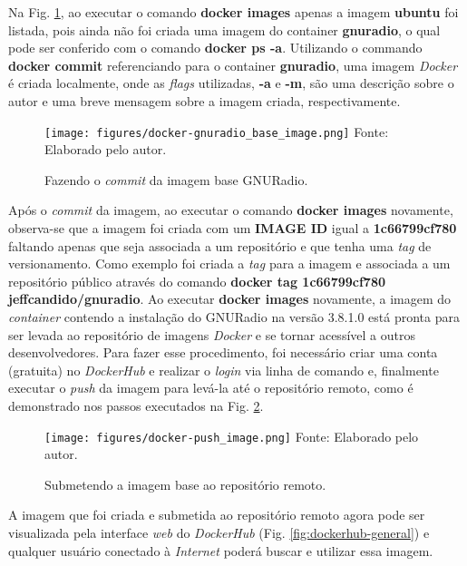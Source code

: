 \documentclass[
  12pt,				%
  openright,			%
  twoside,			%
  a4paper,			%
  english,			%
  french,				%
  spanish,			%
  brazil,				%
  ]{abntex2}
\begin{document}
Na Fig. \ref{fig:docker-gnuradio_base_image}, ao executar o comando \textbf{docker images} apenas a imagem \textbf{ubuntu}
foi listada, pois ainda não foi criada uma imagem do container \textbf{gnuradio}, o qual pode ser conferido com o comando
\textbf{docker ps -a}. Utilizando o commando \textbf{docker commit} referenciando para o container \textbf{gnuradio}, uma imagem
\textit{Docker} é criada localmente, onde as \textit{flags} utilizadas, \textbf{-a} e \textbf{-m}, são uma descrição
sobre o autor e uma breve mensagem sobre a imagem criada, respectivamente.

\begin{figure}[!htb]
  \centering
  \caption{Fazendo o \textit{commit} da imagem base GNURadio.}
  \texttt{[image: figures/docker-gnuradio\_base\_image.png]}
  Fonte: Elaborado pelo autor.
  \label{fig:docker-gnuradio_base_image}
\end{figure}

Após o \textit{commit} da imagem, ao executar o comando \textbf{docker images} novamente, observa-se que a imagem foi criada com
um \textbf{IMAGE ID} igual a \textbf{1c66799cf780} faltando apenas que seja associada a um repositório e que tenha uma \textit{tag} de versionamento.
Como exemplo foi criada a \textit{tag} para a imagem e associada a um repositório público através do comando \textbf{docker tag 1c66799cf780 jeffcandido/gnuradio}.
Ao executar \textbf{docker images} novamente, a imagem do \textit{container} contendo a instalação do GNURadio na versão 3.8.1.0
está pronta para ser levada ao repositório de imagens \textit{Docker} e se tornar acessível a outros desenvolvedores. Para
fazer esse procedimento, foi necessário criar uma conta (gratuita) no \textit{DockerHub} e realizar o \textit{login} via linha de comando e, finalmente
executar o \textit{push} da imagem para levá-la até o repositório remoto, como é demonstrado nos passos executados na Fig. \ref{fig:docker-push_image}.

\begin{figure}[!htb]
  \centering
  \caption{Submetendo a imagem base ao repositório remoto.}
  \texttt{[image: figures/docker-push\_image.png]}
  Fonte: Elaborado pelo autor.
  \label{fig:docker-push_image}
\end{figure}

A imagem que foi criada e submetida ao repositório remoto agora pode ser visualizada pela interface \textit{web} do \textit{DockerHub} (Fig. \ref{fig:dockerhub-general}) e qualquer usuário
conectado à \textit{Internet} poderá buscar e utilizar essa imagem.
\end{document}
